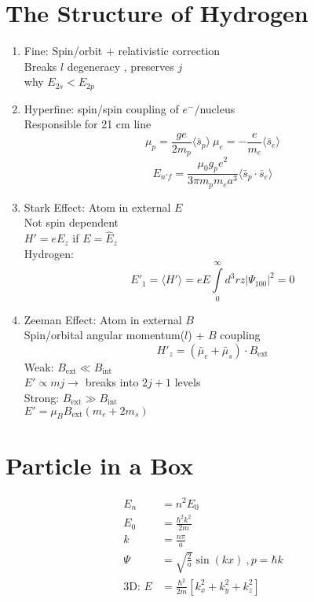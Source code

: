 \documentclass[10pt,letter]{article}
\begin{document}
\section{The Structure of Hydrogen} %
\label{sec:the_structure_of_hydrogen}
\begin{enumerate}
    \item Fine: Spin/orbit + relativistic correction\\
    Breaks $l$ degeneracy , preserves $j$\\
    why $E_{2s} < E_{2p}$
    \item Hyperfine: spin/spin coupling of $e^-/$nucleus\\
    Responsible for 21 cm line\\
    \begin{equation}
        \mu_p = \frac{ge}{2m_p} \langle \bar{s}_p \rangle ~ \mu_e = -\frac{e}{m_e} \langle \bar{s}_e \rangle
    \end{equation}
    \begin{equation}
        E_{n'f} = \frac{\mu_0 g_p e^2}{3 \pi m_p m_e a^3} \langle \bar{s}_p \cdot \bar{s}_e \rangle
    \end{equation}
    \item Stark Effect: Atom in external $E$\\
    Not spin dependent\\
    $H' = eE_z$ if $E = \hat{E}_z$\\
    Hydrogen:
    \begin{equation}
        E'_1= \langle H' \rangle = eE\int \limits_0^\infty d^3rz | \Psi_{100} | ^2 = 0
    \end{equation}
    \item Zeeman Effect: Atom in external $B$\\
    Spin/orbital angular momentum($l$) + $B$ coupling
    \begin{equation}
        H'_z = (\bar{\mu}_e+ \bar{\mu}_s) \cdot B_{\textrm{ext}}
    \end{equation}
    Weak: $B_{\textrm{ext}} \ll B_{\textrm{int}}$\\
    $E'\propto mj \rightarrow$ breaks into $2j+1$ levels\\
    Strong: $B_{\textrm{ext}} \gg B_{\textrm{int}}$\\
    $E' = \mu_B B_{\textrm{ext}} (m_e + 2m_s)$
\end{enumerate}

\section{Particle in a Box} %
\label{sec:particle_in_a_box}
\begin{align}
    E_n &= n^2E_0\\
    E_0 &= \frac{\hbar^2 k^2}{2m}\\
    k &= \frac{n\pi}{a}\\
    \Psi &= \sqrt{\frac{2}{a}} \sin (kx)~, p=\hbar k\\
    \textrm{3D: }E &= \frac{\hbar^2}{2m} [k_x^2 + k_y^2 + k_z^2]
\end{align}
\end{document}
